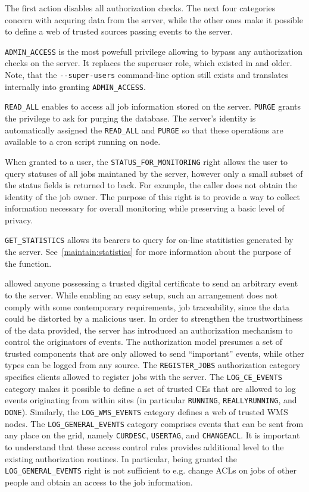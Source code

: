 The first action disables all authorization checks. The next four categories concern with acquring data from the \LB
server, while the other ones make it possible to define a web of trusted sources
passing events to the \LB server.

\verb'ADMIN_ACCESS' is the most powefull privilege allowing to bypass any
authorization checks on the server. It replaces the superuser role, which
existed in  and older. Note, that the \verb'--super-users'
command-line option still exists and translates internally into granting
\verb'ADMIN_ACCESS'.

\verb'READ_ALL' enables to access all job information stored on the server.
\verb'PURGE' grants the privilege to ask for purging the \LB database.  The \LB
server's identity is automatically assigned the \verb'READ_ALL' and
\verb'PURGE' so that these operations are available \eg to a cron script
running on \LB node.

When granted to a user, the \verb'STATUS_FOR_MONITORING' right allows the user to
query statuses of all jobs maintaned by the server, however only a small
subset of the status fields is returned to back. For example, the caller
does not obtain the identity of the job owner. The purpose of this right is
to provide a way to collect information necessary for overall monitoring
while preserving a basic level of privacy.

\verb'GET_STATISTICS' allows its bearers to query for on-line statitistics
generated by the \LB server. See~\ref{maintain:statistics} for more
information about the purpose of the function.

 allowed anyone possessing a trusted digital certificate to send an
arbitrary event to the \LB server. While enabling an easy setup, such an
arrangement does not comply with some contemporary requirements, \eg job
traceability, since the data could be distorted by a malicious user.  In order
to strengthen the trustworthiness of the data provided, the 
server has introduced an authorization mechanism to control the originators
of events.  The authorization model presumes a set of trusted components
that are only allowed to send ``important'' events, while other types can be
logged from any source. The \verb'REGISTER_JOBS' authorization category
specifies clients allowed to register jobs with the \LB server. The
\verb'LOG_CE_EVENTS' category makes it possible to define a set of trusted
CEs that are allowed to log events originating from within sites (in
particular \verb'RUNNING', \verb'REALLYRUNNING', and \verb'DONE').
Similarly, the \verb'LOG_WMS_EVENTS' category defines a web of trusted WMS
nodes. The \verb'LOG_GENERAL_EVENTS' category comprises events that can be
sent from any place on the grid, namely \verb'CURDESC', \verb'USERTAG', and
\verb'CHANGEACL'. It is important to understand that these access control
rules provides additional level to the existing authorization routines.
In particular, being granted the \verb'LOG_GENERAL_EVENTS' right is not sufficient to
e.g. change ACLs on jobs of other people and obtain an access to the job information.

